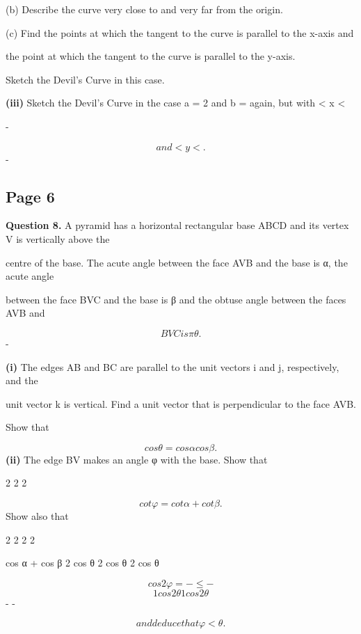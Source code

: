 \documentclass[12pt]{article}
\begin{document}
\begin{flushleft}
(b) Describe the curve very close to and very far from the origin.\par
(c) Find the points at which the tangent to the curve is parallel to the x-axis and\par
the point at which the tangent to the curve is parallel to the y-axis.\par
Sketch the Devil's Curve in this case.\par
\textbf{(iii)} Sketch the Devil's Curve in the case a = 2 and b =  again, but with < x <\par
-\infty \infty\par
\[and < y < .\]
-\infty \infty\par
\end{flushleft}
\subsection*{Page 6}
\begin{flushleft}
\bigskip\textbf{Question 8.} A pyramid has a horizontal rectangular base ABCD and its vertex V is vertically above the\par
centre of the base. The acute angle between the face AVB and the base is α, the acute angle\par
between the face BVC and the base is β and the obtuse angle between the faces AVB and\par
\[BVC is \pi θ.\]
-\par
\textbf{(i)} The edges AB and BC are parallel to the unit vectors i and j, respectively, and the\par
unit vector k is vertical. Find a unit vector that is perpendicular to the face AVB.\par
Show that\par
\[cos θ = cos α cos β .\]
\textbf{(ii)} The edge BV makes an angle φ with the base. Show that\par
2 2 2\par
\[cot φ = cot α + cot β.\]
Show also that\par
2 2 2 2\par
cos α + cos β 2 cos θ 2 cos θ 2 cos θ\par
\[cos 2 φ = - \leq -\]
\[1 cos2 θ 1 cos2 θ\]
- -\par
\[and deduce that φ < θ .\]
\end{flushleft}
\end{document}
